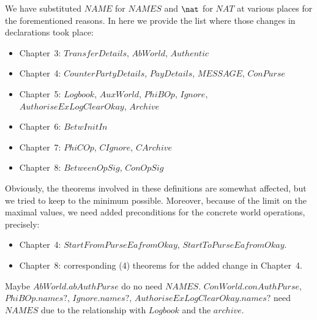 We have substituted $NAME$ for $NAMES$ and $\nat$ for $NAT$ at various places
for the forementioned reasons. In here we provide the list where those changes
in declarations took place:
%
\begin{itemize}
   \item Chapter~3: $TransferDetails$, $AbWorld$, $Authentic$
   \item Chapter~4: $CounterPartyDetails$, $PayDetails$, $MESSAGE$, $ConPurse$
   \item Chapter~5: $Logbook$, $AuxWorld$, $PhiBOp$, $Ignore$, $AuthoriseExLogClearOkay$, $Archive$
   \item Chapter~6: $BetwInitIn$
   \item Chapter~7: $PhiCOp$, $CIgnore$, $CArchive$
   \item Chapter~8: $BetweenOpSig$, $ConOpSig$
\end{itemize}
%
Obviously, the theorems involved in these definitions are somewhat affected, but we
tried to keep to the minimum possible. Moreover, because of the limit on the maximal
values, we need added preconditions for the concrete world operations, precisely:
%
\begin{itemize}
   \item Chapter~4: $StartFromPurseEafromOkay$, $StartToPurseEafromOkay$.
   \item Chapter~8: corresponding (4) theorems for the added change in Chapter~4.
\end{itemize}
%
%
Maybe $AbWorld.abAuthPurse$ do no need $NAMES$.
%
$ConWorld.conAuthPurse$, $PhiBOp.names?$, $Ignore.names?$, $AuthoriseExLogClearOkay.names?$
need $NAMES$ due to the relationship with $Logbook$ and the $archive$.

\ldefsummary %
\lthmsummary %
\lthmaddeddefsummary %
\lthmaddedthmsummary %
\lzevessummary %


